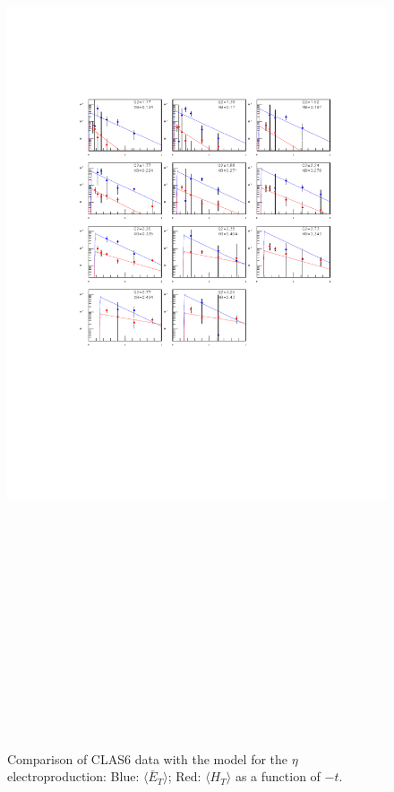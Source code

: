 \documentclass[prc,floatfix,superscriptaddress]{revtex4}
\newcommand{\GPDHT}{\langle H_T \rangle}
\newcommand{\GPDETbar}{\langle \bar{E}_T \rangle}
\begin{document}

\begin{figure}[t!]
\vspace*{-10 mm}
\centerline{
\includegraphics[height=30cm]{../Test_plots/eta_HT2_ET2.pdf}
}
\label{eta_gff}
\vspace*{-70mm}
\caption{Comparison of CLAS6 data with the model for the $\eta$ electroproduction:
Blue: $\GPDETbar$;
Red: $\GPDHT$  as a function of $-t$.
}\label{fig:eta_gff}
\end{figure}
\end{document}
